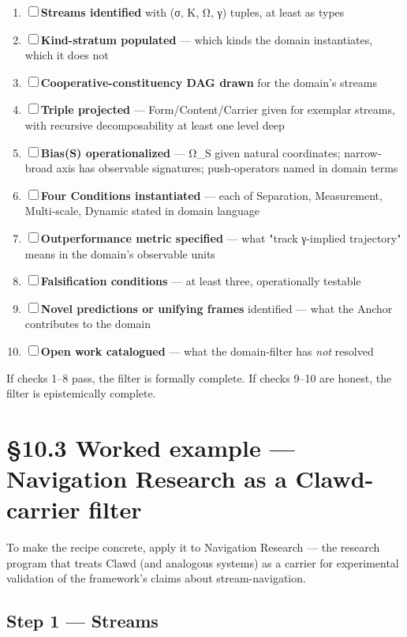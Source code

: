 \documentclass[11pt, openany]{book}
\newcommand{\sectionbreak}{\clearpage}
\begin{document}
\begin{enumerate}
\item ☐ \textbf{Streams identified} with (σ, K, Ω, γ) tuples, at least as types
\item ☐ \textbf{Kind-stratum populated} --- which kinds the domain instantiates, which it does not
\item ☐ \textbf{Cooperative-constituency DAG drawn} for the domain's streams
\item ☐ \textbf{Triple projected} --- Form/Content/Carrier given for exemplar streams, with recursive decomposability at least one level deep
\item ☐ \textbf{Bias(S) operationalized} --- Ω\_\allowbreak{}S given natural coordinates; narrow-broad axis has observable signatures; push-operators named in domain terms
\item ☐ \textbf{Four Conditions instantiated} --- each of Separation, Measurement, Multi-scale, Dynamic stated in domain language
\item ☐ \textbf{Outperformance metric specified} --- what "track γ-implied trajectory" means in the domain's observable units
\item ☐ \textbf{Falsification conditions} --- at least three, operationally testable
\item ☐ \textbf{Novel predictions or unifying frames} identified --- what the Anchor contributes to the domain
\item ☐ \textbf{Open work catalogued} --- what the domain-filter has \textit{not} resolved
\end{enumerate}

If checks 1–8 pass, the filter is formally complete. If checks 9–10 are honest, the filter is epistemically complete.

\sectionbreak

\section{§10.3 Worked example --- Navigation Research as a Clawd-carrier filter}

To make the recipe concrete, apply it to Navigation Research --- the research program that treats Clawd (and analogous systems) as a carrier for experimental validation of the framework's claims about stream-navigation.

\subsection{Step 1 --- Streams}
\end{document}
